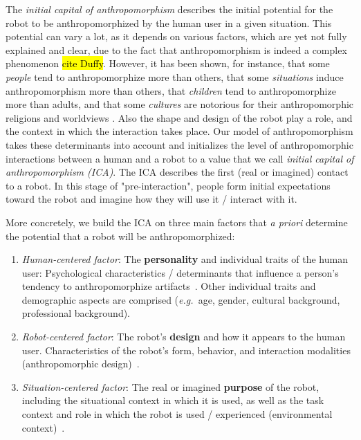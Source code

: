 \documentclass{sig-alternate-2013}
\newcommand{\eg}{{\textit{e.g.~}}}
\begin{document}
The \emph{initial capital of anthropomorphism} describes the initial potential 
for the robot to be anthropomorphized by the human user in a given situation.
This potential can vary a lot, as it depends on various factors, which are yet not fully explained and clear, due to the fact that anthropomorphism is indeed a complex
phenomenon \hl{cite Duffy}. However, it has been shown, for instance,
that some \textit{people} tend to anthropomorphize more than others, that some
\textit{situations} induce anthropomorphism more than others, that
\textit{children} tend to anthropomorphize more than adults, and that some
\textit{cultures} are notorious for their anthropomorphic religions and
worldviews \cite{epley_when_2008}. Also the shape and design of the robot 
play a role, and the context in which the interaction takes place. Our model of anthropomorphism takes these determinants into account and initializes the level of anthropomorphic interactions between a human and a robot to a value that we call
\textit{initial capital of anthropomorphism (ICA)}. The ICA describes the first (real or imagined) contact to a robot. In this stage of "pre-interaction", people form initial expectations toward the robot and imagine how they will use it / interact with it.

More concretely, we build the ICA on three main factors that \textit{a priori} determine the potential that a robot will be anthropomorphized:

\begin{enumerate}

    \item \emph{Human-centered factor}: The \textbf{personality} and individual
        traits of the human user: Psychological characteristics / determinants
        that influence a person's tendency to anthropomorphize
        artifacts~\cite{epley_seeing_2007}. Other individual traits and
        demographic aspects are comprised (\eg age, gender, cultural
        background, professional background).
	
    \item \emph{Robot-centered factor}: The robot's \textbf{design} and how it
        appears to the human user. Characteristics of the robot's form,
        behavior, and interaction modalities (anthropomorphic
        design)~\cite{fong_survey_2003}.
	
    \item \emph{Situation-centered factor}: The real or imagined
        \textbf{purpose} of the robot, including the situational context in
        which it is used, as well as the task context and role in which the robot is 				used / experienced (environmental context)~\cite{joosse_what_2013}.

\end{enumerate}	
\end{document}
